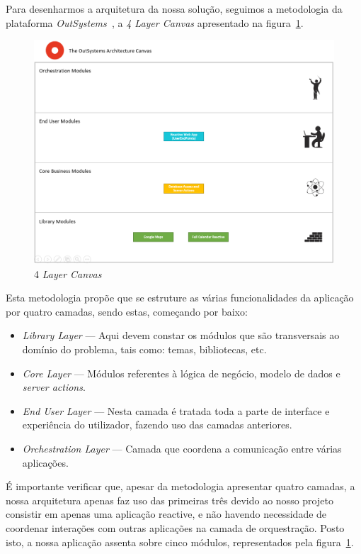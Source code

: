Para desenharmos a arquitetura da nossa solução, seguimos a metodologia da plataforma \textit{OutSystems~\cite{outsystems}}, a \textit{4 Layer Canvas} apresentado na figura~\ref{fig:4lc}.

\begin{figure}[H]
  \centering 
  \includegraphics[scale=0.5]{figures/4LayerCanvas.png}
  \caption{4 \textit{Layer Canvas}}\label{fig:4lc}
\end{figure}

Esta metodologia propõe que se estruture as várias funcionalidades da aplicação por quatro camadas, sendo estas, começando por baixo: 

\begin{itemize}
    \item \textit{Library Layer} --- Aqui devem constar os módulos que são transversais ao domínio do problema, tais como: temas, bibliotecas, etc. 
    \item \textit{Core Layer} --- Módulos referentes à lógica de negócio, modelo de dados e \textit{server actions}. 
    \item \textit{End User Layer} --- Nesta camada é tratada toda a parte de interface e experiência do utilizador, fazendo uso das camadas anteriores. 
    \item \textit{Orchestration Layer} --- Camada que coordena a comunicação entre várias aplicações. 
\end{itemize}

É importante verificar que, apesar da metodologia apresentar quatro camadas, 
a nossa arquitetura apenas faz uso das primeiras três devido ao nosso projeto consistir em apenas uma aplicação reactive, 
e não havendo necessidade de coordenar interações com outras aplicações na camada de orquestração. 
Posto isto, a nossa aplicação assenta sobre cinco módulos, representados pela figura~\ref{fig:4lc}.

